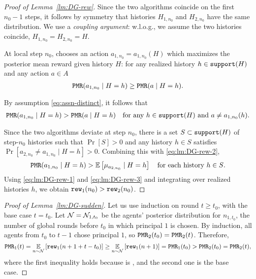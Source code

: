 \begin{proof}[Proof of Lemma~\ref{lm:DG-rew}]
Since the two algorithms coincide on the first $n_0-1$ steps, it follows by symmetry that histories $H_{1,n_0}$ and $H_{2,n_0}$ have the same distribution. We use a \emph{coupling argument}: w.l.o.g., we assume the two histories coincide,
    $H_{1,n_0} = H_{2,n_0} = H$.

At local step $n_0$, \DynGreedy chooses an action $a_{1,n_0} = a_{1,n_0}(H)$
which maximizes the posterior mean reward given history $H$: for any realized history $h\in \mathtt{support}(H)$ and any action $a\in A$
\begin{align}\label{eq:lm:DG-rew-1}
 \mathtt{PMR}(a_{1,n_0} \mid H = h) \geq \mathtt{PMR}(a \mid H=h).
\end{align}

By assumption \eqref{eq:assn-distinct}, it follows that
\begin{align}\label{eq:lm:DG-rew-2}
 \mathtt{PMR}(a_{1,n_0} \mid H = h) > \mathtt{PMR}(a \mid H=h)
 \quad \text{for any $h\in \mathtt{support}(H)$ and $a\neq a_{1,n_0}(h)$.}
\end{align}

Since the two algorithms deviate at step $n_0$, there is a set $S\subset \mathtt{support}(H)$ of step-$n_0$ histories such that $\Pr[S]>0$ and any history $h\in S$ satisfies
    $\Pr[a_{2,n_0}\neq a_{1,n_0} \mid H=h]>0$.
Combining this with \eqref{eq:lm:DG-rew-2},
\begin{align}\label{eq:lm:DG-rew-3}
 \PMR(a_{1,n_0} \mid H = h) > \E\left[ \mu_{a_{2,n_0}}\mid H=h \right]
 \quad\text{for each history $h\in S$}.
\end{align}
Using \eqref{eq:lm:DG-rew-1} and \eqref{eq:lm:DG-rew-3} and integrating over realized histories $h$, we obtain
    $\mathtt{rew}_1(n_0) > \mathtt{rew}_2(n_0)$.
\end{proof}

\begin{proof}[Proof of Lemma~\ref{lm:DG-sudden}]
Let us use induction on round $t\geq t_0$, with the base case $t=t_0$. Let $\mathcal{N}=\mathcal{N}_{1,t_0}$ be the agents' posterior distribution for $n_{1,t_0}$, the number of global rounds before $t_0$ in which principal $1$ is chosen. By induction, all agents from $t_0$ to $t-1$ chose principal $1$, so $\mathtt{PMR}_2(t_0)= \mathtt{PMR}_2(t)$. Therefore,
\[ \mathtt{PMR}_1(t)
    = \operatorname*{\mathbb{E}}_{n\sim \mathcal{N}}\left[\mathtt{rew}_1(n+1+t-t_0)\right]
    \geq \operatorname*{\mathbb{E}}_{n\sim \mathcal{N}}\left[\mathtt{rew}_1(n+1)\right]
    =\mathtt{PMR}_1(t_0) > \mathtt{PMR}_2(t_0)= \mathtt{PMR}_2(t), \]
where the first inequality holds because \alg[1] is \bmonotone, and the second one is the base case.
\end{proof}

